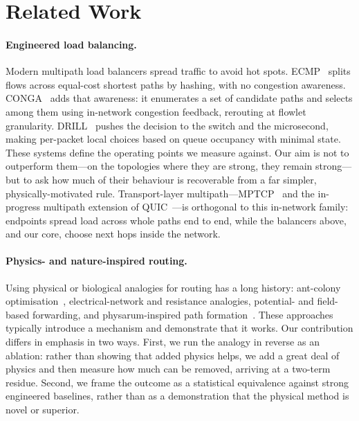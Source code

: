 \section{Related Work}
\label{sec:related}

\paragraph{Engineered load balancing.}
Modern multipath load balancers spread traffic to avoid hot spots.
ECMP~\cite{ecmp} splits flows across equal-cost shortest paths by hashing, with
no congestion awareness. CONGA~\cite{conga} adds that awareness: it enumerates a
set of candidate paths and selects among them using in-network congestion
feedback, rerouting at flowlet granularity. DRILL~\cite{drill} pushes the
decision to the switch and the microsecond, making per-packet local choices
based on queue occupancy with minimal state. These systems define the operating
points we measure against. Our aim is not to outperform them---on the
topologies where they are strong, they remain strong---but to ask how much of
their behaviour is recoverable from a far simpler, physically-motivated rule. Transport-layer multipath---MPTCP~\cite{ford2013mptcp} and the in-progress multipath extension of QUIC~\cite{ietfquicmultipath}---is orthogonal to this in-network family: endpoints spread load across whole paths end to end, while the balancers above, and our core, choose next hops inside the network.

\paragraph{Physics- and nature-inspired routing.}
Using physical or biological analogies for routing has a long history:
ant-colony optimisation~\cite{dicaro1998antnet}, electrical-network and resistance analogies,
potential- and field-based forwarding, and physarum-inspired path formation~\cite{tero2010physarum}.
These approaches typically introduce a mechanism and demonstrate that it works.
Our contribution differs in emphasis in two ways. First, we run the analogy in
reverse as an ablation: rather than showing that added physics helps, we add a
great deal of physics and then measure how much can be removed, arriving at a
two-term residue. Second, we frame the outcome as a statistical equivalence
against strong engineered baselines, rather than as a demonstration that the
physical method is novel or superior.

